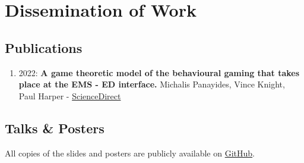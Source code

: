 \chapter*{Dissemination of Work}

\section*{Publications}
\begin{enumerate}
\def\labelenumi{\arabic{enumi}.}
\item
2022: \textbf{A game theoretic model of the behavioural gaming that takes place
at the EMS - ED interface.} Michalis Panayides, Vince Knight, Paul Harper -
\href{https://www.sciencedirect.com/science/article/pii/S0377221722005549?via%3Dihub}{ScienceDirect}
\end{enumerate}

\section*{Talks \& Posters}

All copies of the slides and posters are publicly available on
\href{https://github.com/MichalisPanayides/Talks}{GitHub}.

